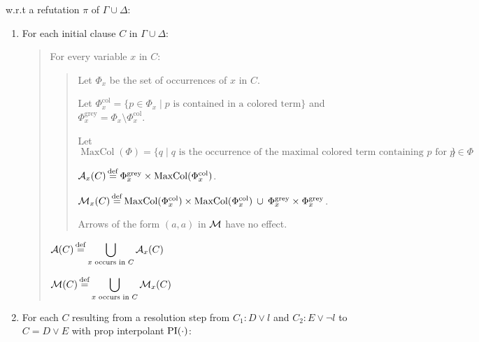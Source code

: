 \documentclass[,%
	paper=a4,%
	DIV14, %
	twoside=false,%
	liststotoc,
	bibtotoc,
	draft=false,%
	numbers=noendperiod
]{scrartcl}
\begin{document}
w.r.t a refutation $\pi$ of $\Gamma \cup \Delta$:

\newcommand{\Phicol}{\Phi^{\operatorname{col}}}
\newcommand{\Phigrey}{\Phi^{\operatorname{grey}}}
\newcommand{\MaxCol}{\operatorname{MaxCol}}
\begin{enumerate}
	\item For each initial clause $C$ in $\Gamma \cup \Delta$:

		\begin{quote}
		For every variable $x$ in $C$:

		\begin{quote}

		Let $\Phi_x$ be the set of occurrences of $x$ in $C$. 

		Let $\Phicol_x = \{p \in \Phi_x \mid \text{$p$ is contained in a colored term} \}$
		and $\Phigrey_x = \Phi_x \setminus \Phicol_x$.

		Let $\MaxCol(\Phi) = \{q \mid \text{$q$ is the occurrence of the maximal colored term containing $p$ for $p \in \Phi$} \}$

		$\arr_x(C) \defeq \Phigrey_x \times \MaxCol(\Phicol_x)$. 
		

		$\warr_x(C) \defeq \MaxCol(\Phicol_x) \times \MaxCol(\Phicol_x) \spam\cup
		\Phigrey_x\times\Phigrey_x$. 

		Arrows of the form $(a, a)$ in $\operatorname{\operatorname{\mathcal{M}}}$ have no effect.
		\end{quote}

		$\operatorname{\mathcal{A}}(C) \operatorname{\stackrel{\mathrm{def}}{=}}\displaystyle \bigcup_{ x \text{ occurs in }C} \operatorname{\mathcal{A}}_x(C)$

		$\operatorname{\operatorname{\mathcal{M}}}(C) \operatorname{\stackrel{\mathrm{def}}{=}}\displaystyle \bigcup_{x \text{ occurs in }C} \operatorname{\operatorname{\mathcal{M}}}_x(C)$
		\end{quote}



	\item 
		For each $C$ resulting from a resolution step from $C_1: D\lor l$ and $C_2: E\lor \lnot l$ to $C = D \lor E$ with prop interpolant $\operatorname{PI}(\cdot)$:


\end{enumerate}
\end{document}

